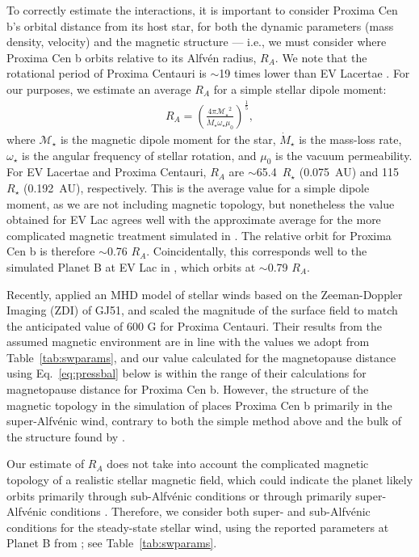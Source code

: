 \documentclass{emulateapj}
\begin{document}
To correctly estimate the interactions, it is important to consider Proxima Cen b's orbital distance from its host star, for both the dynamic parameters (mass density, velocity) and the magnetic structure --- i.e., we must consider where Proxima Cen b orbits relative to its Alfv\'{e}n radius, $R_A$. We note that the rotational period of Proxima Centauri \citep[82.6 days;][]{Collins2016} is $\sim$19 times lower than EV Lacertae \citep[4.376 days;][]{Testa2004}. For our purposes, we estimate an average $R_A$ for a simple stellar dipole moment:
%
\begin{align}
    R_A = \left( \frac{4 \pi \mathcal{M_\star}^2}{\dot{M}_\star \omega_\star \mu_0} \right)^{\frac{1}{5}},
\end{align}
%
\noindent where $\mathcal{M_\star}$ is the magnetic dipole moment for the star, $\dot{M}_\star$ is the mass-loss rate, $\omega_\star$ is the angular frequency of stellar rotation, and $\mu_0$ is the vacuum permeability. For EV Lacertae and Proxima Centauri, $R_A$ are $\sim$65.4~$R_\star$ (0.075~AU) and 115~$R_\star$ (0.192~AU), respectively. This is the average value for a simple dipole moment, as we are not including magnetic topology, but nonetheless the value obtained for EV Lac agrees well with the approximate average for the more complicated magnetic treatment simulated in \citet{Cohen2014}. The relative orbit for Proxima Cen b is therefore $\sim$0.76 $R_A$. Coincidentally, this corresponds well to the simulated Planet B at EV Lac in \citet{Cohen2014}, which orbits at $\sim$0.79 $R_A$. 

Recently, \citet{Garraffo2016} applied an MHD model of stellar winds based on the Zeeman-Doppler Imaging (ZDI) of GJ51, and scaled the magnitude of the surface field to match the anticipated value of 600 G for Proxima Centauri. Their results from the assumed magnetic environment are in line with the values we adopt from Table~\ref{tab:swparams}, and our value calculated for the magnetopause distance using Eq.~\ref{eq:pressbal} below is within the range of their calculations for magnetopause distance for Proxima Cen b. However, the structure of the magnetic topology in the simulation of \citet{Garraffo2016} places Proxima Cen b primarily in the super-Alfv\'{e}nic wind, contrary to both the simple method above and the bulk of the structure found by \citet{Cohen2014}.

Our estimate of $R_A$ does not take into account the complicated magnetic topology of a realistic stellar magnetic field, which could indicate the planet likely orbits primarily through sub-Alfv\'{e}nic conditions \citep[e.g., Fig. 1 of][]{Cohen2014} or through primarily super-Alfv\'{e}nic conditions \citep[Fig. 2 from][]{Garraffo2016}. Therefore, we consider both super- and sub-Alfv\'{e}nic conditions for the steady-state stellar wind, using the reported parameters at Planet B from \citet{Cohen2014}; see Table~\ref{tab:swparams}.
 
\end{document}
